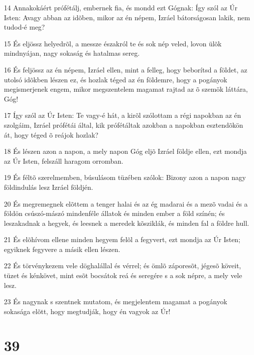 \par 14 Annakokáért prófétálj, embernek fia, és mondd ezt Gógnak: Így szól az Úr Isten: Avagy abban az idõben, mikor az én népem, Izráel bátorságosan lakik, nem tudod-é meg?
\par 15 És eljössz helyedrõl, a messze északról te és sok nép veled, lovon ülõk mindnyájan, nagy sokaság és hatalmas sereg.
\par 16 És feljössz az én népem, Izráel ellen, mint a felleg, hogy beborítsd a földet, az utolsó idõkben lészen ez, és hozlak téged az én földemre, hogy a pogányok megismerjenek engem, mikor megszentelem magamat rajtad az õ szemök láttára, Góg!
\par 17 Így szól az Úr Isten: Te vagy-é hát, a kirõl szólottam a régi napokban az én szolgáim, Izráel prófétái által, kik prófétáltak azokban a napokban esztendõkön át, hogy téged õ reájok hozlak?
\par 18 És lészen azon a napon, a mely napon Góg eljõ Izráel földje ellen, ezt mondja az Úr Isten, felszáll haragom orromban.
\par 19 És féltõ szerelmemben, búsulásom tüzében szólok: Bizony azon a napon nagy földindulás lesz Izráel földjén.
\par 20 És megremegnek elõttem a tenger halai és az ég madarai és a mezõ vadai és a földön csúszó-mászó mindenféle állatok és minden ember a föld színén; és leszakadnak a hegyek,  és leesnek a meredek kõsziklák, és minden fal a földre hull.
\par 21 És elõhívom ellene minden hegyem felõl a fegyvert, ezt mondja az Úr Isten; egyiknek fegyvere a másik ellen lészen.
\par 22 És törvénykezem vele döghalállal és vérrel; és ömlõ záporesõt, jégesõ köveit, tüzet és kénkövet, mint esõt bocsátok reá és seregére s a sok népre, a mely vele lesz.
\par 23 És nagynak s szentnek mutatom, és megjelentem magamat a pogányok sokasága elõtt, hogy megtudják, hogy én vagyok az Úr!

\chapter{39}

